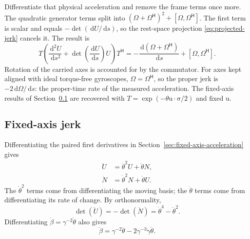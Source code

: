\documentclass[11pt]{article}
\newcommand{\pv}[1]{{#1}}
\newcommand{\pvGreek}[1]{{#1}}
\newcommand{\vstyle}[1]{{\bm{\mathrm{#1}}}}
\newcommand{\pN}{\pv{N}}
\newcommand{\pT}{\pv{T}}
\newcommand{\pU}{\pv{U}}
\newcommand{\pvOmega}{\pvGreek{\Omega}}
\numberwithin{equation}{section}
\newcommand{\dotprod}{\cdot}
\newcommand{\bsig}{\vstyle{\sigma}}
\newcommand{\bu}{\vstyle{u}}
\newcommand{\dd}{\,\mathrm d}
\begin{document}
Differentiate that physical acceleration and remove the frame terms
once more. The quadratic generator terms split into
$(\pvOmega+\pvOmega^{\mathsf H})^2+[\pvOmega,\pvOmega^{\mathsf H}]$.
The first term is scalar and equals
$-\det(\dd\pU/\dd s)$, so the rest-space projection
\eqref{eq:projected-jerk} cancels it. The result is
\begin{equation}
 \pT\left(\frac{\dd^2\pU}{\dd s^2}
 +\det\left(\frac{\dd\pU}{\dd s}\right)\pU\right)\pT^{\mathsf H}
 =-\frac{\dd(\pvOmega+\pvOmega^{\mathsf H})}{\dd s}
 +[\pvOmega,\pvOmega^{\mathsf H}].
 \label{eq:carried-jerk}
\end{equation}
Rotation of the carried axes is accounted for by the commutator. For axes
kept aligned with ideal torque-free gyroscopes,
$\pvOmega=\pvOmega^{\mathsf H}$, so the proper jerk is
$-2\dd\pvOmega/\dd s$: the proper-time rate of the measured acceleration.
The fixed-axis results of Section~\ref{sec:fixed-axis-jerk} are recovered with
$\pT=\exp(-\theta\bu\dotprod\bsig/2)$ and fixed $\bu$.

\subsection{Fixed-axis jerk}
\label{sec:fixed-axis-jerk}
Differentiating the paired first derivatives in
Section~\ref{sec:fixed-axis-acceleration} gives
\begin{align*}
 \ddot{\pU}&=\dot{\theta}^2\pU+\ddot{\theta}\pN,\\
 \ddot{\pN}&=\dot{\theta}^2\pN+\ddot{\theta}\pU.
\end{align*}
The $\dot{\theta}^2$ terms come from differentiating the moving basis;
the $\ddot{\theta}$ terms come from differentiating its rate of change.
By orthonormality,
\[
 \det(\ddot{\pU})=-\det(\ddot{\pN})
 =\dot{\theta}^4-\ddot{\theta}^2.
\]
Differentiating $\dot\beta=\gamma^{-2}\dot\theta$ also gives
\[
 \ddot{\beta}=\gamma^{-2}\ddot{\theta}
 -2\gamma^{-3}\dot{\gamma}\dot{\theta}.
\]
\end{document}
